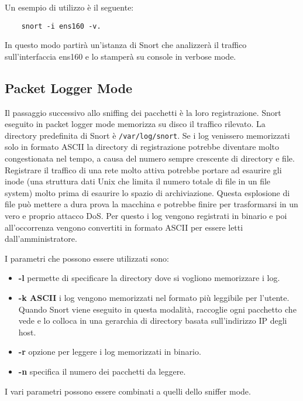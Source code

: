 Un esempio di utilizzo è il seguente:

\begin{verbatim}
    snort -i ens160 -v.
\end{verbatim}

In questo modo partirà un'istanza di Snort che analizzerà il traffico sull'interfaccia ens160 e lo stamperà su console in verbose mode.

\subsection{Packet Logger Mode}

Il passaggio successivo allo sniffing dei pacchetti è la loro registrazione. Snort eseguito in packet logger mode memorizza su disco il traffico rilevato. La directory predefinita di Snort è \texttt{/var/log/snort}. Se i log venissero memorizzati solo in formato ASCII la directory di registrazione potrebbe diventare molto congestionata nel tempo, a causa del numero sempre crescente di directory e file. Registrare il traffico di una rete molto attiva potrebbe portare ad esaurire gli inode (una struttura dati Unix che limita il numero totale di file in un file system) molto prima di esaurire lo spazio di archiviazione. Questa esplosione di file può mettere a dura prova la macchina e potrebbe finire per trasformarsi in un vero e proprio attacco DoS. Per questo i log vengono registrati in binario e poi all'occorrenza vengono convertiti in formato ASCII per essere letti dall'amministratore.

I parametri che possono essere utilizzati sono:

\begin{itemize}
    \item \textbf{-l} permette di specificare la directory dove si vogliono memorizzare i log.
    \item \textbf{-k ASCII} i log vengono memorizzati nel formato più leggibile per l'utente. Quando Snort viene eseguito in questa modalità, raccoglie ogni pacchetto che vede e lo colloca in una gerarchia di directory basata sull'indirizzo IP degli host.
    \item \textbf{-r} opzione per leggere i log memorizzati in binario.
    \item \textbf{-n} specifica il numero dei pacchetti da leggere.
\end{itemize}

I vari parametri possono essere combinati a quelli dello sniffer mode.

